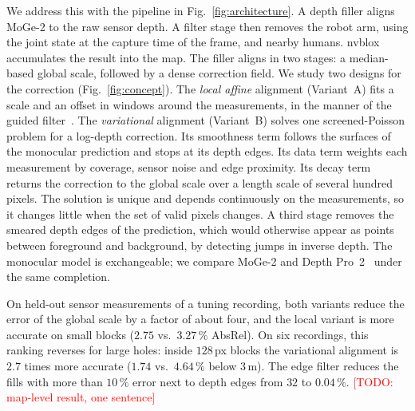 \documentclass[conference]{IEEEtran}
\newcommand{\todo}[1]{\textcolor{red}{[TODO: #1]}}
\begin{document}
We address this with the pipeline in Fig.~\ref{fig:architecture}. A depth
filler aligns MoGe-2 to the raw sensor depth. A filter stage then removes the
robot arm, using the joint state at the capture time of the frame, and
nearby humans. nvblox accumulates the result into the map. The filler aligns
in two stages: a median-based global scale, followed by a dense correction field. We
study two designs for the correction (Fig.~\ref{fig:concept}). The
\emph{local affine} alignment (Variant~A) fits a scale and an offset in
windows around the measurements, in the manner of the guided
filter~\cite{he2013guided}. The \emph{variational} alignment (Variant~B)
solves one screened-Poisson problem for a log-depth correction. Its
smoothness term follows the surfaces of the monocular prediction and stops at
its depth edges. Its data term weights each measurement by coverage, sensor
noise and edge proximity. Its decay term returns the correction to the global
scale over a length scale of several hundred pixels. The solution is unique
and depends continuously on the measurements, so it changes little when the
set of valid pixels changes. A third stage removes the smeared depth edges of
the prediction, which would otherwise appear as points between foreground and
background, by detecting jumps in inverse depth. The monocular model is
exchangeable; we compare MoGe-2 and Depth Pro~2~\cite{hu2026depthpro2} under
the same completion.

On held-out sensor measurements of a tuning recording, both variants reduce the
error of the global scale by a factor of about four, and the local variant is
more accurate on small blocks (\(2.75\) vs.\ \(3.27\,\%\) AbsRel). On six
recordings, this ranking reverses for large holes: inside \(128\,\)px blocks
the variational alignment is \(2.7\) times more accurate (\(1.74\) vs.\
\(4.64\,\%\) below \(3\,\)m). The edge filter reduces the fills with more than
\(10\,\%\) error next to depth edges from \(32\) to \(0.04\,\%\). \todo{map-level result, one sentence}
\end{document}
